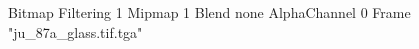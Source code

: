 {Bitmap
	{Filtering 1}
	{Mipmap 1}
	{Blend none}
	{AlphaChannel 0}
	{Frame "ju_87a_glass.tif.tga"}
}
